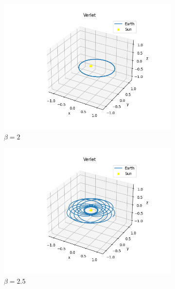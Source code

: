    \begin{figure}[H]
		\centering
		\begin{subfigure}{0.48\linewidth}
			\includegraphics[width=1.2\linewidth]{Figure/Verlet_elliptical_B200.png}
			\caption{$\beta=2$}
		\end{subfigure}
		\begin{subfigure}{0.48\linewidth}
			\includegraphics[width=1.15\linewidth]{Figure/Verlet_elliptical_B250.png}
			\caption{$\beta=2.5$}
		\end{subfigure}
		\begin{subfigure}{0.48\linewidth}

\end{subfigure}
\end{figure}

